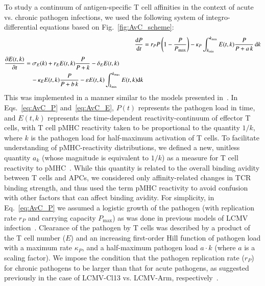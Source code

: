 To study a continuum of antigen-specific T cell affinities in the context of acute vs. chronic pathogen infections, we used the following system of integro-differential equations based on Fig.~\ref{fig:AvC_scheme}:
%
\begin{align}
    \dv{P}{t} &= r_P P \left( 1 - \frac{P}{P_{\textrm{max}}}\right) - \kappa_P \int_{k_{\textrm{min}}}^{k_{\textrm{max}}} E(t,k) \frac{P}{P+a \, k} \, \dd k \label{eq:AvC_P} \\[0.3em]
    \begin{split}
        \pdv{E(t,k)}{t} &= \sigma_E(k) + r_E E(t,k) \frac{P}{P+k} - \delta_E E(t,k) \\
        &\quad- \kappa_E E(t,k) \frac{P}{P+b\,k} - \varepsilon E(t,k) \int_{k_{\textrm{min}}}^{k_{\textrm{max}}} E(t,k) \dd k
    \end{split} \label{eq:AvC_E}
\end{align}
%
This was implemented in a manner similar to the models presented in~\cite{jamaleddine2020quantifying,jaberi2015continuum}. In Eqs.~\eqref{eq:AvC_P} and~\eqref{eq:AvC_E}, $P(t)$ represents the pathogen load in time, and $E(t,k)$ represents the time-dependent reactivity-continuum of effector T cells, with T cell pMHC reactivity taken to be proportional to the quantity $1/k$, where $k$ is the pathogen load for half-maximum activation of T cells. To facilitate understanding of pMHC-reactivity distributions, we defined a new, unitless quantity $a_k$ (whose magnitude is equivalent to $1/k$) as a measure for T cell reactivity to pMHC~\cite{standifer2009changes}. While this quantity is related to the overall binding avidity between T cells and APCs, we considered only affinity-related changes in TCR binding strength, and thus used the term pMHC reactivity to avoid confusion with other factors that can affect binding avidity. For simplicity, in Eq.~\eqref{eq:AvC_P} we assumed a logistic growth of the pathogen (with replication rate $r_P$ and carrying capacity $P_\textrm{max}$) as was done in previous models of LCMV infection~\cite{bocharov1998modelling,kecsmir2003clonal}. Clearance of the pathogen by T cells was described by a product of the T cell number ($E$) and an increasing first-order Hill function of pathogen load with a maximum rate $\kappa_P$, and a half-maximum pathogen load $a \cdot k$ (where $a$ is a scaling factor). We impose the condition that the pathogen replication rate ($r_P$) for chronic pathogens to be larger than that for acute pathogens, as suggested previously in the case of LCMV-Cl13 vs. LCMV-Arm, respectively~\cite{bergthaler2010viral,sullivan2011point}.


